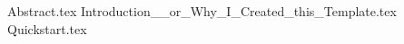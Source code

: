 \documentclass{article}
\begin{document}
  \begin{titlepage}
    \centering
    \vspace*{2cm}
    \titleblock [2cm]
    \vspace{1cm}  %
    \authorblock
    \vfill  %
    \location \\
    \dateblock \\
    \footnotesize { \texttt{\fullversion} }
  \end{titlepage}

  {Abstract.tex}
  \newpage
  \tableofcontents
  \newpage
  {Introduction__or_Why_I_Created_this_Template.tex}
  {Quickstart.tex}

  \printbibliography
\end{document}
